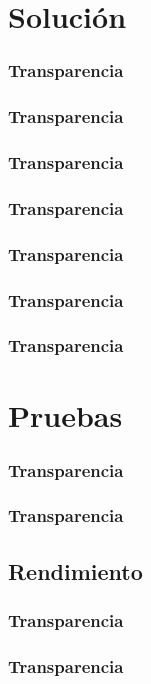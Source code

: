 \documentclass{beamer}
\begin{document}
    \section{Solución}
    \begin{frame}
        \frametitle{Transparencia}
    \end{frame}
    \begin{frame}
        \frametitle{Transparencia}
    \end{frame}
    \begin{frame}
        \frametitle{Transparencia}
    \end{frame}
    \begin{frame}
        \frametitle{Transparencia}
    \end{frame}
    \begin{frame}
        \frametitle{Transparencia}
    \end{frame}
    \begin{frame}
        \frametitle{Transparencia}
    \end{frame}
    \begin{frame}
        \frametitle{Transparencia}
    \end{frame}
    \section{Pruebas}
    \begin{frame}
        \frametitle{Transparencia}
    \end{frame}
    \begin{frame}
        \frametitle{Transparencia}
    \end{frame}
    \subsection{Rendimiento}
    \begin{frame}
        \frametitle{Transparencia}
    \end{frame}
    \begin{frame}
        \frametitle{Transparencia}
    \end{frame}
\end{document}

